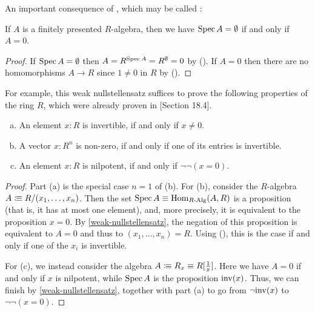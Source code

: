 An important consequence of , which may be called :

\begin{proposition}%
  \label{weak-nullstellensatz}
  If $A$ is a finitely presented $R$-algebra,
  then we have $\operatorname{Spec} A=\emptyset$ if and only if $A=0$.
\end{proposition}

\begin{proof}
  If $\operatorname{Spec} A = \emptyset$
  then $A = R^{\operatorname{Spec} A} = R^\emptyset = 0$
  by ().
  If $A = 0$
  then there are no homomorphisms $A \to R$
  since $1 \neq 0$ in $R$ by ().
\end{proof}

For example, this weak nullstellensatz suffices
to prove the following properties of the ring $R$,
which were already proven in
\cite{ingo-thesis}[Section 18.4].

\begin{proposition}%
  \label{nilpotence-double-negation}\label{non-zero-invertible}\label{generalized-field-property}
  
  \begin{enumerate}[(a)]
  \item An element $x:R$ is invertible,
    if and only if $x\neq 0$.
  \item A vector $x:R^n$ is non-zero,
    if and only if one of its entries is invertible.
  \item An element $x:R$ is nilpotent,
    if and only if $\neg \neg (x=0)$.
  \end{enumerate}
\end{proposition}

\begin{proof}
  Part (a) is the special case $n = 1$ of (b).
  For (b),
  consider the $R$-algebra $A \vcentcolon\mspace{-1.2mu}\equiv R/(x_1, \dots, x_n)$.
  Then the set $\operatorname{Spec} A \equiv \mathrm{Hom}_{R\text{-}\mathrm{Alg}}(A, R)$
  is a proposition (that is, it has at most one element),
  and, more precisely, it is equivalent to the proposition $x = 0$.
  By \cref{weak-nullstellensatz},
  the negation of this proposition is equivalent to $A = 0$
  and thus to $(x_1, \dots, x_n) = R$.
  Using (),
  this is the case if and only if one of the $x_i$ is invertible.

  For (c),
  we instead consider the algebra $A \vcentcolon\mspace{-1.2mu}\equiv R_x \equiv R[\frac{1}{x}]$.
  Here we have $A = 0$ if and only if $x$ is nilpotent,
  while $\operatorname{Spec} A$ is the proposition $\mathrm{inv}(x)$.
  Thus, we can finish by \cref{weak-nullstellensatz},
  together with part (a) to go from $\lnot \mathrm{inv}(x)$ to $\lnot \lnot (x = 0)$.
\end{proof}

